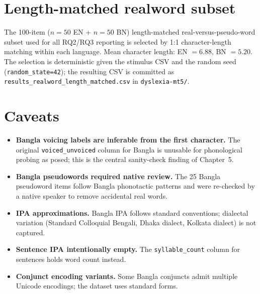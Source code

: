 \section*{Length-matched realword subset}

The 100-item ($n = 50$ EN + $n = 50$ BN) length-matched real-versus-pseudo-word subset used for all RQ2/RQ3 reporting is selected by 1:1 character-length matching within each language. Mean character length: EN $= 6.88$, BN $= 5.20$. The selection is deterministic given the stimulus CSV and the random seed (\texttt{random\_state=42}); the resulting CSV is committed as \texttt{results\_realword\_length\_matched.csv} in \texttt{dyslexia-mt5/}.

\section*{Caveats}

\begin{itemize}
    \item \textbf{Bangla voicing labels are inferable from the first character.} The original \texttt{voiced\_unvoiced} column for Bangla is unusable for phonological probing as posed; this is the central sanity-check finding of Chapter~5.
    \item \textbf{Bangla pseudowords required native review.} The 25 Bangla pseudoword items follow Bangla phonotactic patterns and were re-checked by a native speaker to remove accidental real words.
    \item \textbf{IPA approximations.} Bangla IPA follows standard conventions; dialectal variation (Standard Colloquial Bengali, Dhaka dialect, Kolkata dialect) is not captured.
    \item \textbf{Sentence IPA intentionally empty.} The \texttt{syllable\_count} column for sentences holds word count instead.
    \item \textbf{Conjunct encoding variants.} Some Bangla conjuncts admit multiple Unicode encodings; the dataset uses standard forms.
\end{itemize}

